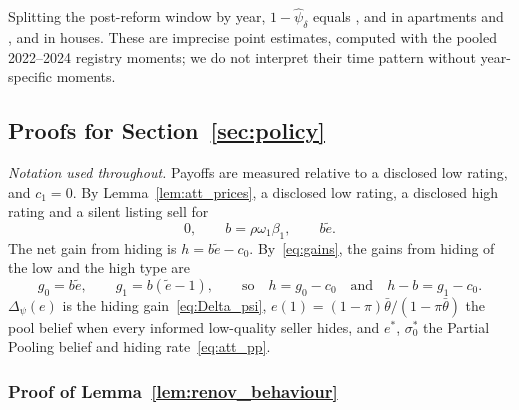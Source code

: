 Splitting the post-reform window by year, $1-\hat\psi_\delta$ equals \attOneMinusPsiYoneApt, \attOneMinusPsiYtwoApt{} and \attOneMinusPsiYthreeApt{} in apartments and \attOneMinusPsiYoneHouse, \attOneMinusPsiYtwoHouse{} and \attOneMinusPsiYthreeHouse{} in houses. These are imprecise point estimates, computed with the pooled 2022--2024 registry moments; we do not interpret their time pattern without year-specific moments. 

\subsection*{Proofs for Section~\ref{sec:policy}}

\noindent\emph{Notation used throughout.} Payoffs are measured relative to a disclosed low rating, and $c_1=0$. By Lemma~\ref{lem:att_prices}, a disclosed low rating, a disclosed high rating and a silent listing sell for
\begin{equation*}
    0,\qquad b=\rho\omega_1\beta_1,\qquad b\tilde e.
\end{equation*}
The net gain from hiding is $h=b\tilde e-c_0$. By~\eqref{eq:gains}, the gains from hiding of the low and the high type are
\begin{equation*}
    g_0=b\tilde e,\qquad g_1=b(\tilde e-1),\qquad\text{so}\quad h=g_0-c_0\quad\text{and}\quad h-b=g_1-c_0.
\end{equation*}
$\Delta_\psi(e)$ is the hiding gain~\eqref{eq:Delta_psi}, $e(1)=(1-\pi)\bar\theta/(1-\pi\bar\theta)$ the pool belief when every informed low-quality seller hides, and $e^*$, $\sigma_0^*$ the Partial Pooling belief and hiding rate~\eqref{eq:att_pp}.

\subsubsection*{Proof of Lemma~\ref{lem:renov_behaviour}}

